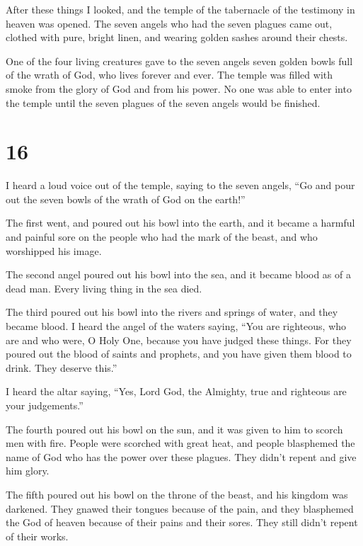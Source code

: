  After these things I looked, and the temple of the
tabernacle of the testimony in heaven was opened.  The seven
angels who had the seven plagues came out, clothed with pure, bright
linen, and wearing golden sashes around their chests.

 One of the four living creatures gave to the seven angels
seven golden bowls full of the wrath of God, who lives forever and ever.
 The temple was filled with smoke from the glory of God and
from his power. No one was able to enter into the temple until the seven
plagues of the seven angels would be finished.

\hypertarget{section-15}{%
\section{16}\label{section-15}}

 I heard a loud voice out of the temple, saying to the seven
angels, ``Go and pour out the seven bowls of the wrath of God on the
earth!''

 The first went, and poured out his bowl into the earth, and
it became a harmful and painful sore on the people who had the mark of
the beast, and who worshipped his image.

 The second angel poured out his bowl into the sea, and it
became blood as of a dead man. Every living thing in the sea died.

 The third poured out his bowl into the rivers and springs
of water, and they became blood.  I heard the angel of the
waters saying, ``You are righteous, who are and who were, O Holy One,
because you have judged these things.  For they poured out
the blood of saints and prophets, and you have given them blood to
drink. They deserve this.''

 I heard the altar saying, ``Yes, Lord God, the Almighty,
true and righteous are your judgements.''

 The fourth poured out his bowl on the sun, and it was given
to him to scorch men with fire.  People were scorched with
great heat, and people blasphemed the name of God who has the power over
these plagues. They didn't repent and give him glory.

 The fifth poured out his bowl on the throne of the beast,
and his kingdom was darkened. They gnawed their tongues because of the
pain,  and they blasphemed the God of heaven because of
their pains and their sores. They still didn't repent of their works.

